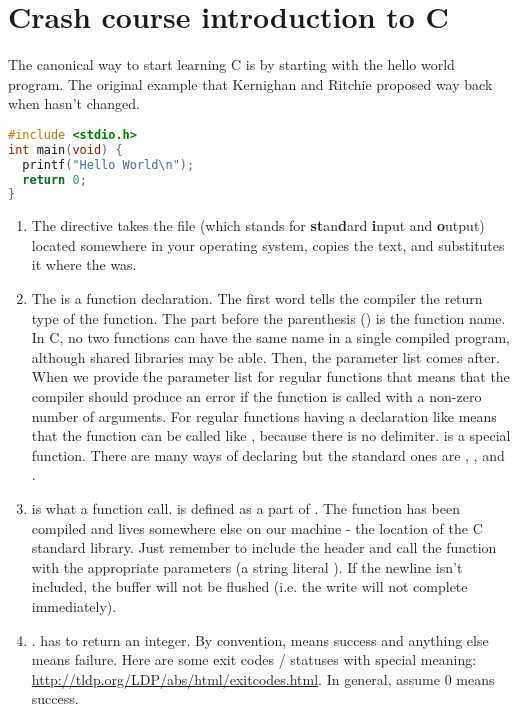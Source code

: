 \section{Crash course introduction to C}

The canonical way to start learning C is by starting with the \gls{hello world} program.
The original example that Kernighan and Ritchie proposed way back when hasn't changed.

\begin{lstlisting}[language=C]
#include <stdio.h>
int main(void) {
  printf("Hello World\n");
  return 0;
}
\end{lstlisting}

\begin{enumerate}
	\item The  directive takes the file  (which stands for \textbf{st}an\textbf{d}ard \textbf{i}nput and \textbf{o}utput) located somewhere in your operating system, copies the text, and substitutes it where the  was.
	\item The  is a function declaration.
    The first word  tells the compiler the return type of the function.
    The part before the parenthesis () is the function name.
    In C, no two functions can have the same name in a single compiled program, although shared libraries may be able.
    Then, the parameter list comes after.
    When we provide the parameter list for regular functions  that means that the compiler should produce an error if the function is called with a non-zero number of arguments.
    For regular functions having a declaration like  means that the function can be called like , because there is no delimiter.
     is a special function.
    There are many ways of declaring  but the standard ones are , , and .
	\item {} is what a function call.
     is defined as a part of .
    The function has been compiled and lives somewhere else on our machine - the location of the C standard library.
    Just remember to include the header and call the function with the appropriate parameters (a string literal ).
    If the newline isn't included, the buffer will not be flushed (i.e. the write will not complete immediately).
	\item {}.
     has to return an integer.
    By convention,  means success and anything else means failure.
    Here are some exit codes / statuses with special meaning: \url{http://tldp.org/LDP/abs/html/exitcodes.html}.
    In general, assume 0 means success.
\end{enumerate}

